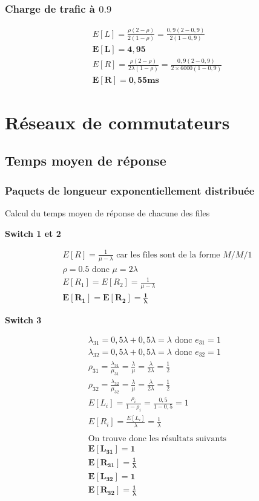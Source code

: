 \documentclass[12pt, a4paper]{article}
\begin{document}
\subsubsection{Charge de trafic \`a $0.9$}

\begin{gather*}
E[L] = \frac{\rho(2-\rho)}{2(1-\rho)} = \frac{0,9(2-0,9)}{2(1-0,9)} \\
\bm{E[L] = 4,95} \\
E[R] = \frac{\rho(2-\rho)}{2\lambda(1-\rho)} = \frac{0,9(2-0,9)}{2\times6000(1-0,9)} \\
\bm{E[R] =0,55ms}
\end{gather*}

\newpage

\section{R\'eseaux de commutateurs}
\subsection{Temps moyen de r\'eponse}
\subsubsection{Paquets de longueur exponentiellement distribu\'ee}
\quad Calcul du temps moyen de r\'eponse de chacune des files

\medskip
\textbf{Switch 1 et 2}

\begin{gather*}
E[R] = \frac{1}{\mu - \lambda} \text{ car les files sont de la forme } M/M/1 \\
\rho = 0.5 \text{ donc } \mu = 2\lambda \\
E[R_{1}]=E[R_{2}]=\frac{1}{\mu-\lambda} \\
\bm{E[R_{1}]=E[R_{2}]=\frac{1}{\lambda}} 
\end{gather*}

\textbf{Switch 3}

\begin{gather*}
\lambda_{31} = 0,5\lambda + 0,5\lambda = \lambda \text{ donc } e_{31}=1 \\
\lambda_{32} = 0,5\lambda + 0,5\lambda = \lambda \text{ donc } e_{32}=1 \\
\rho_{31}=\frac{\lambda_{31}}{\mu_{31}} = \frac{\lambda}{\mu} = \frac{\lambda}{2\lambda}=\frac{1}{2} \\
\rho_{32}=\frac{\lambda_{32}}{\mu_{32}} = \frac{\lambda}{\mu} = \frac{\lambda}{2\lambda}=\frac{1}{2} \\
E[L_{i}] = \frac{\rho_{i}}{1-\rho_{i}} = \frac{0,5}{1-0,5} = 1 \\
E[R_{i}] = \frac{E[L_{i}]}{\lambda} = \frac{1}{\lambda} \\\\
\text{On trouve donc les r\'esultats suivants} \\
\bm{E[L_{31}] = 1} \\
\bm{E[R_{31}] = \frac{1}{\lambda}} \\
\bm{E[L_{32}] = 1} \\
\bm{E[R_{32}] = \frac{1}{\lambda}} \\
\end{gather*}
\end{document}
